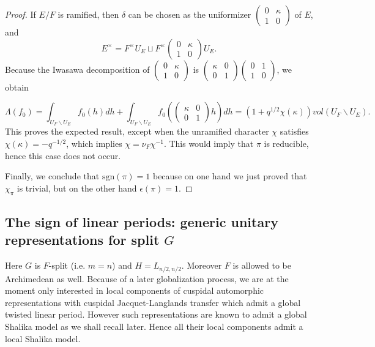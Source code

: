 \documentclass[11pt,letterpaper]{amsart}
\def\1{\mathbf{1}}
\theoremstyle{plain}
\numberwithin{equation}{section}
\newcommand{\sg}{\mathrm{sgn}}
\begin{document}
\begin{proof}
If $E/F$ is ramified, then $\delta$ can be chosen as the uniformizer $\begin{pmatrix} 0 & \kappa  \\1 & 0 \end{pmatrix}$ of $E$, and 
\[E^\times=F^\times U_E \sqcup  F^\times \begin{pmatrix} 0 & \kappa  \\1 & 0 \end{pmatrix}U_E .\] Because the Iwasawa decomposition of $\begin{pmatrix} 0 & \kappa  \\ 1 & 0 \end{pmatrix}$ is 
$\begin{pmatrix} \kappa & 0 \\ 0 & 1 \end{pmatrix}\begin{pmatrix} 0 & 1  \\ 1 & 0 \end{pmatrix}$, we obtain 

\[\Lambda(f_0)=\int_{U_F \backslash U_E} f_0(h)dh+\int_{U_F \backslash U_E} f_0\left(\begin{pmatrix} \kappa & 0 \\ 0 & 1 \end{pmatrix}h\right)dh=(1+q^{1/2}\chi(\kappa))vol(U_F \backslash U_E).\] This proves the expected result, except when the unramified character $\chi$ satisfies $\chi(\kappa)=-q^{-1/2}$, which implies $\chi=\nu_F \chi^{-1}$. This would imply that $\pi$ is reducible, hence this case does not occur.

Finally, we conclude that $\sg(\pi)=1$ because on one hand we just proved that $\chi_{\pi}$ is trivial, but on the other hand 
$\epsilon(\pi)=1$.
\end{proof}


\subsection{The sign of linear periods: generic unitary representations for split $G$}\label{sec gen sign}

Here $G$ is $F$-split (i.e. $m=n$) and $H=L_{n/2,n/2}$. Moreover $F$ is allowed to be Archimedean as well. Because of a later globalization process, we are at the moment only interested in local components of cuspidal automorphic representations with cuspidal Jacquet-Langlands transfer which admit a global twisted linear period. However such representations are known to admit a global Shalika model as we shall recall later. Hence all their local components admit a local Shalika model.
\end{document}
